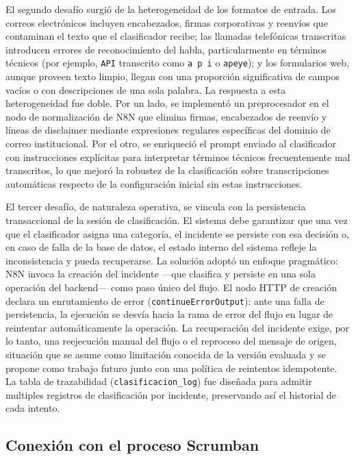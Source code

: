 El segundo desafío surgió de la heterogeneidad de los formatos de entrada. Los correos electrónicos incluyen encabezados, firmas corporativas y reenvíos que contaminan el texto que el clasificador recibe; las llamadas telefónicas transcritas introducen errores de reconocimiento del habla, particularmente en términos técnicos (por ejemplo, \texttt{API} transcrito como \texttt{a p i} o \texttt{apeye}); y los formularios web, aunque proveen texto limpio, llegan con una proporción significativa de campos vacíos o con descripciones de una sola palabra. La respuesta a esta heterogeneidad fue doble. Por un lado, se implementó un preprocesador en el nodo de normalización de N8N que elimina firmas, encabezados de reenvío y líneas de disclaimer mediante expresiones regulares específicas del dominio de correo institucional. Por el otro, se enriqueció el prompt enviado al clasificador con instrucciones explícitas para interpretar términos técnicos frecuentemente mal transcritos, lo que mejoró la robustez de la clasificación sobre transcripciones automáticas respecto de la configuración inicial sin estas instrucciones.

El tercer desafío, de naturaleza operativa, se vincula con la persistencia transaccional de la sesión de clasificación. El sistema debe garantizar que una vez que el clasificador asigna una categoría, el incidente se persiste con esa decisión o, en caso de falla de la base de datos, el estado interno del sistema refleje la inconsistencia y pueda recuperarse. La solución adoptó un enfoque pragmático: N8N invoca la creación del incidente ---que clasifica y persiste en una sola operación del backend--- como paso único del flujo. El nodo HTTP de creación declara un enrutamiento de error (\texttt{continueErrorOutput}): ante una falla de persistencia, la ejecución se desvía hacia la rama de error del flujo en lugar de reintentar automáticamente la operación. La recuperación del incidente exige, por lo tanto, una reejecución manual del flujo o el reproceso del mensaje de origen, situación que se asume como limitación conocida de la versión evaluada y se propone como trabajo futuro junto con una política de reintentos idempotente. La tabla de trazabilidad (\texttt{clasificacion\_log}) fue diseñada para admitir multiples registros de clasificación por incidente, preservando así el historial de cada intento.

\subsection{Conexión con el proceso Scrumban}\label{subsec:conexion-scrumban}

